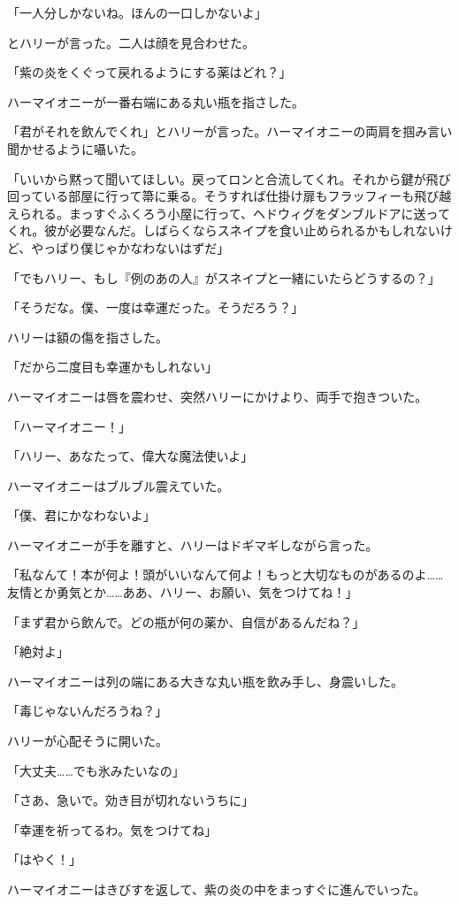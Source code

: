 \documentclass[10pt,a4paper]{article}
\begin{document}
\begin{CJK}{UTF8}{min}
「一人分しかないね。ほんの一口しかないよ」

とハリーが言った。二人は顔を見合わせた。

「紫の炎をくぐって戻れるようにする薬はどれ？」

ハーマイオニーが一番右端にある丸い瓶を指さした。

「君がそれを飲んでくれ」とハリーが言った。ハーマイオニーの両肩を掴み言い聞かせるように囁いた。

「いいから黙って聞いてほしい。戻ってロンと合流してくれ。それから鍵が飛び回っている部屋に行って箒に乗る。そうすれば仕掛け扉もフラッフィーも飛び越えられる。まっすぐふくろう小屋に行って、ヘドウィグをダンブルドアに送ってくれ。彼が必要なんだ。しばらくならスネイプを食い止められるかもしれないけど、やっぱり僕じゃかなわないはずだ」

「でもハリー、もし『例のあの人』がスネイプと一緒にいたらどうするの？」

「そうだな。僕、一度は幸運だった。そうだろう？」

ハリーは額の傷を指さした。

「だから二度目も幸運かもしれない」

ハーマイオニーは唇を震わせ、突然ハリーにかけより、両手で抱きついた。

「ハーマイオニー！」

「ハリー、あなたって、偉大な魔法使いよ」

ハーマイオニーはブルブル震えていた。

「僕、君にかなわないよ」

ハーマイオニーが手を離すと、ハリーはドギマギしながら言った。

「私なんて！本が何よ！頭がいいなんて何よ！もっと大切なものがあるのよ……友情とか勇気とか……ああ、ハリー、お願い、気をつけてね！」

「まず君から飲んで。どの瓶が何の薬か、自信があるんだね？」

「絶対よ」

ハーマイオニーは列の端にある大きな丸い瓶を飲み手し、身震いした。

「毒じゃないんだろうね？」

ハリーが心配そうに開いた。

「大丈夫……でも氷みたいなの」

「さあ、急いで。効き目が切れないうちに」

「幸運を祈ってるわ。気をつけてね」

「はやく！」

ハーマイオニーはきびすを返して、紫の炎の中をまっすぐに進んでいった。


\end{CJK}
\end{document}
